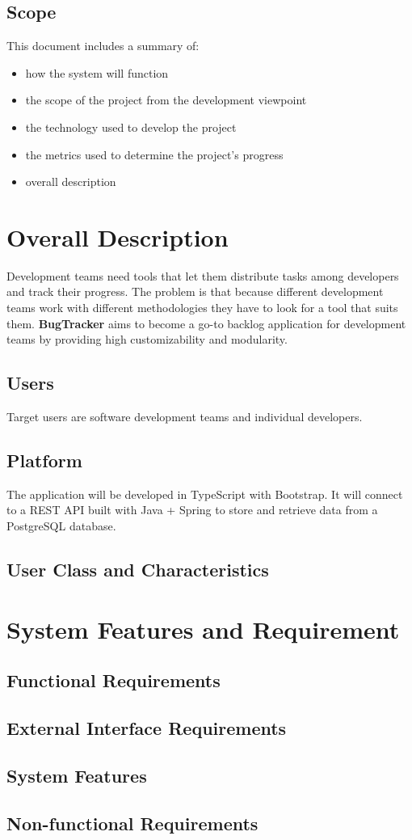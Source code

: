 \documentclass[a4paper]{article}
\newcommand{\appNameBold}{\textbf{BugTracker}}
\begin{document}
    \subsection{Scope}
    This document includes a summary of:
    \begin{itemize}
        \item how the system will function
        \item the scope of the project from the development viewpoint
        \item the technology used to develop the project
        \item the metrics used to determine the project's progress
        \item overall description
    \end{itemize}

    \section{Overall Description}
    Development teams need tools that let them distribute tasks among developers and track their progress.
    The problem is that because different development teams work with different methodologies they have to look for a tool that suits them.
    \appNameBold{} aims to become a go-to backlog application for development teams by providing high customizability and modularity.

    \subsection{Users}
    Target users are software development teams and individual developers.

    \subsection{Platform}
    The application will be developed in TypeScript with Bootstrap. It will connect to a REST API built with Java + Spring to store and retrieve data from a PostgreSQL database.

    \subsection{User Class and Characteristics}

    \section{System Features and Requirement}
    \subsection{Functional Requirements}
    \subsection{External Interface Requirements}
    \subsection{System Features}
    \subsection{Non-functional Requirements}
\end{document}
